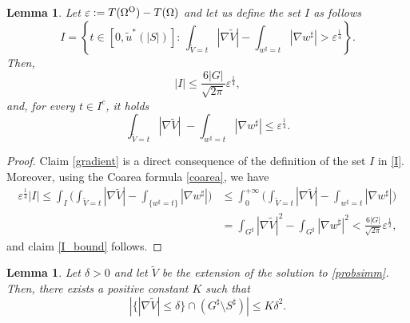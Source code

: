 \documentclass[oneside,a4paper,11pt,notitlepage]{article}
\newcommand{\abs}[1]{{\left|#1\right|}}
\theoremstyle{definition}
\theoremstyle{plain}
\newtheorem{lemma}[theorem]{Lemma}
\theoremstyle{definition}
\newcommand{\OO}{\text{\normalfont  O}}
\begin{document}
\begin{lemma} \label{lemmaI}
Let $\varepsilon:=T(\Omega^\OO) - T(\Omega)$ and let us define 
the set $I$ as follows
   \begin{equation}
\label{I}
I=\left\{t \in [0, \tilde u^\ast (\abs{S})] :\,\int_{\tilde V = t}\abs{\nabla \tilde V}-\int_{w^\sharp=t}\abs{\nabla w^\sharp}>\varepsilon^{\frac{1}{4}}\right\}.
\end{equation}
    Then,    
    \begin{equation}\label{I_bound}
        \abs{I}\le \frac{6\abs{G}}{\sqrt{2\pi}}  \varepsilon^{\frac{1}{4}},
    \end{equation}
and, for every  $t\in I^c$,  it holds
\begin{equation}
\label{gradient}
\int_{\tilde V = t}\abs{\nabla \tilde V}\;-\int_{w^\sharp=t}|\nabla w^\sharp|\leq \varepsilon^{\frac14}.
\end{equation}
    
\end{lemma}
\begin{proof}
Claim \eqref{gradient}  is a direct consequence of the definition of the set $I$ in \eqref{I}. Moreover, using  the Coarea formula \eqref{coarea}, we have
\begin{align*}
    \varepsilon^{\frac14}\abs{I}\leq \int_{I}\biggl(\int_{\tilde V = t}\abs{\nabla \tilde V}-\int_{\{w^\sharp=t\}}|\nabla w^\sharp|\biggr)&\leq \int_0^{+\infty}\biggl(\int_{\tilde V = t}\abs{\nabla \tilde V}-\int_{w^\sharp=t}|\nabla w^\sharp|\biggr)\\&=\int_{G^\sharp}\abs{\nabla \tilde V}^2-\int_{G^\sharp}|\nabla w^\sharp|^2<\frac{6\abs{G}}{\sqrt{2\pi}} \varepsilon^\frac{1}{2}, 
    \end{align*}
and claim \eqref{I_bound} follows.
\end{proof}
\begin{lemma}
   Let $\delta>0$ and let  $\tilde V$ be the extension of the solution to \eqref{probsimm}. Then, there exists a positive constant $K$ such that
    \begin{equation*}
        \abs{\{\abs{\nabla \tilde V}\leq\delta\}\cap (G^\sharp\setminus S^\sharp)}\leq K \delta^2.
    \end{equation*}
\end{lemma}
\end{document}
